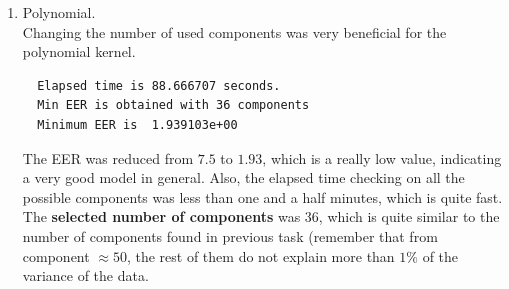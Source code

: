\documentclass[a4paper]{article}
\begin{document}
\begin{enumerate}

\item Polynomial.\\

Changing the number of used components was very beneficial for the polynomial kernel.
\begin{verbatim}
  Elapsed time is 88.666707 seconds.
  Min EER is obtained with 36 components
  Minimum EER is  1.939103e+00 
\end{verbatim}
The EER was reduced from \(7.5\) to \(1.93\), which is a really low value, indicating a very good model in general. Also, the elapsed time checking on all the possible components was less than one and a half minutes, which is quite fast. The \textbf{selected number of components} was 36, which is quite similar to the number of components found in previous task (remember that from component $\approx 50$, the rest of them do not explain more than \(1\%\) of the variance of the data.


\end{enumerate}
\end{document}
